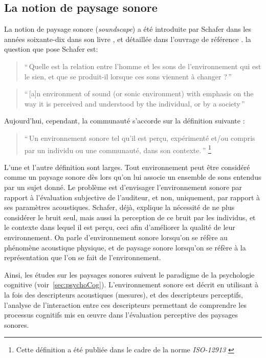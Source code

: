 \subsection{La notion de paysage sonore}

La notion de paysage sonore (\emph{soundscape}) a été introduite par Schafer dans les années soixante-dix dans son livre \citep{schafer1969new}, et détaillée dans l'ouvrage de référence \citep{schafer1977tuning}. la question que pose Schafer est:

\begin{quote}
``\,Quelle est la relation entre l'homme et les sons de l'environnement qui est le sien, et que se produit-il lorsque ces sons viennent à changer ?\,''
\end{quote}


\begin{quote}
``\,[a]n environment of sound (or sonic environment) with emphasis on the way it is perceived and understood by the individual, or by a society\,'' 
\end{quote}

Aujourd'hui, cependant, la communauté s'accorde sur la définition suivante \citep{aletta2016soundscape}:

\begin{quote}
``\,Un environnement sonore tel qu'il est perçu, expérimenté et/ou compris par un individu ou une communauté, dans son contexte.\,'' \footnote{Cette définition a été publiée dans le cadre de la norme \emph{ISO-12913} \citep{iso12913}}
\end{quote}

L'une et l'autre définition sont larges. Tout environnement peut être considéré comme un paysage sonore dès lors qu'on lui associe un ensemble de sons entendus par un sujet donné. Le problème est d'envisager l’environnement sonore par rapport à l'évaluation subjective de l'auditeur, et non, uniquement, par rapport à ses paramètres acoustiques. Schafer, déjà, explique la nécessité de ne plus considérer le bruit seul, mais aussi la perception de ce bruit par les individus, et le contexte dans lequel il est perçu, ceci afin d'améliorer la qualité de leur environnement. On parle d'environnement sonore lorsqu'on se réfère au phénomène acoustique physique, et de paysage sonore  lorsqu'on se réfère à la représentation que l'on se fait de l'environnement.

Ainsi, les études sur les paysages sonores suivent le paradigme de la psychologie cognitive \citep{dubois2006cognitive,maffiolo_caracterisation_1999} (voir~\ref{sec:psychoCog}). L'environnement sonore est décrit en utilisant à la fois des descripteurs acoustiques (mesures), et des descripteurs perceptifs, l'analyse de l'interaction entre ces descripteurs permettant de comprendre les processus cognitifs mis en œuvre dans l'évaluation perceptive des paysages sonores.

